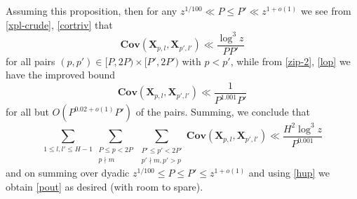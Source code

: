 \documentclass[12pt]{amsart}
\newcommand{\Cov}{\mathbf{Cov}}
\begin{document}
Assuming this proposition, then for any $z^{1/100} \ll P \leq P' \ll z^{1+o(1)}$ we see from \eqref{xpl-crude}, \eqref{cortriv} that
$$ \Cov\left( \mathbf{X}_{p,l}, \mathbf{X}_{p',l'}\right) \ll \frac{\log^3 z}{PP'}$$
for all pairs $(p,p') \in [P,2P) \times [P', 2P')$ with $p < p'$, while from \eqref{zip-2}, \eqref{lop} we have the improved bound
$$ \Cov\left( \mathbf{X}_{p,l}, \mathbf{X}_{p',l'}\right) \ll \frac{1}{P^{1.001} P'} $$
for all but $O(P^{0.02+o(1)} P')$ of the pairs.  Summing,
we conclude that
$$
\sum_{1 \leq l,l' \leq H-1} \sum_{\substack{P \leq p < 2P \\ p \nmid m}} \sum_{\substack{P' \leq p' < 2P' \\ p' \nmid m, p' > p}} \Cov \left( \mathbf{X}_{p,l}, \mathbf{X}_{p',l'} \right) \ll \frac{H^2 \log^3 z}{P^{0.001}}  $$
and on summing over dyadic $z^{1/100} \leq P \leq P' \leq z^{1+o(1)}$ and using \eqref{hup} we obtain \eqref{pout} as desired (with room to spare).
\end{document}
